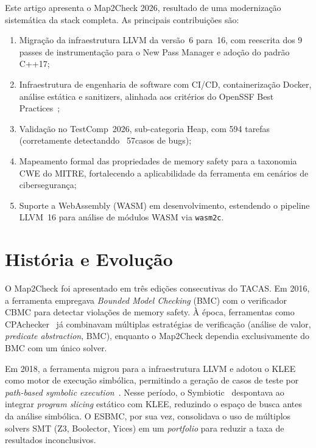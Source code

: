 \documentclass[12pt]{article}
\newcommand{\TotalTasks}{594}
\newcommand{\ScoreTestComp}{57}
\newcommand{\CountPasses}{9}
\newcommand{\LLVMVersion}{16}
\newcommand{\CppStandard}{C++17}
\begin{document}
Este artigo apresenta o Map2Check 2026, resultado de uma modernização sistemática da stack completa. As principais contribuições são:
\begin{enumerate}
\item Migração da infraestrutura LLVM da versão~6 para~\LLVMVersion, com reescrita dos \CountPasses{} passes de instrumentação para o New Pass Manager e adoção do padrão \CppStandard;
\item Infraestrutura de engenharia de software com CI/CD, containerização Docker, análise estática e sanitizers, alinhada aos critérios do OpenSSF Best Practices~\cite{openssf2024};
\item Validação no TestComp~2026, sub-categoria Heap, com \TotalTasks{} tarefas (corretamente detectanddo ~\ScoreTestComp casos de bugs);
\item Mapeamento formal das propriedades de memory safety para a taxonomia CWE do MITRE, fortalecendo a aplicabilidade da ferramenta em cenários de cibersegurança;
\item Suporte a WebAssembly (WASM) em desenvolvimento, estendendo o pipeline LLVM~16 para análise de módulos WASM via \texttt{wasm2c}.
\end{enumerate}


\section{História e Evolução}
\label{sec:historia}

O Map2Check foi apresentado em três edições consecutivas do TACAS. Em 2016, a ferramenta empregava \textit{Bounded Model Checking} (BMC) com o verificador CBMC para detectar violações de memory safety. À época, ferramentas como CPAchecker~\cite{beyersvcomp2013} já combinavam múltiplas estratégias de verificação (análise de valor, \textit{predicate abstraction}, BMC), enquanto o Map2Check dependia exclusivamente do BMC com um único solver.

Em 2018, a ferramenta migrou para a infraestrutura LLVM e adotou o KLEE como motor de execução simbólica, permitindo a geração de casos de teste por \textit{path-based symbolic execution}~\cite{map2check2018}. Nesse período, o Symbiotic~\cite{chalupa2021symbiotic} despontava ao integrar \textit{program slicing} estático com KLEE, reduzindo o espaço de busca antes da análise simbólica. O ESBMC, por sua vez, consolidava o uso de múltiplos solvers SMT (Z3, Boolector, Yices) em um \textit{portfolio} para reduzir a taxa de resultados inconclusivos\cite{gadelha2021esbmc}.
\end{document}
